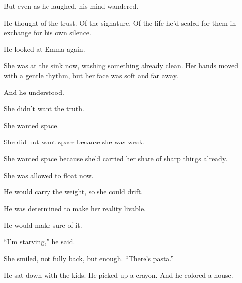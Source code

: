 But even as he laughed, his mind wandered.

He thought of the trust.
Of the signature.
Of the life he’d sealed for them in exchange for his own silence.

He looked at Emma again.

She was at the sink now, washing something already clean. Her hands moved with a gentle rhythm, 
but her face was soft and far away.

And he understood.

She didn’t want the truth.

She wanted space.

She did not want space because she was weak.

She wanted space because she’d carried her share of sharp things already. 

She was allowed to float now. 

He would carry the weight, so she could drift.

He was determined to make her reality livable.

He would make sure of it.

``I’m starving,'' he said.

She smiled, not fully back, but enough. ``There’s pasta.''

He sat down with the kids. He picked up a crayon. And he colored a house.

\medskip

